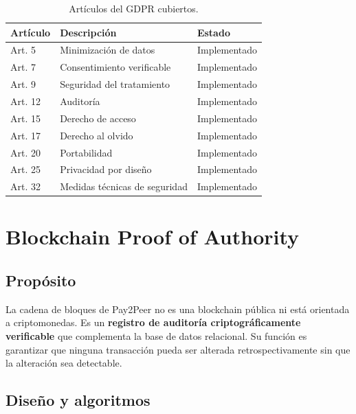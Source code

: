\begin{table}[H]
\centering
\caption{Artículos del GDPR cubiertos.}\label{tab:gdpr}
\begin{tabularx}{\textwidth}{lXl}
\toprule
\textbf{Artículo} & \textbf{Descripción} & \textbf{Estado} \\
\midrule
Art. 5  & Minimización de datos & Implementado \\
Art. 7  & Consentimiento verificable & Implementado \\
Art. 9  & Seguridad del tratamiento & Implementado \\
Art. 12 & Auditoría & Implementado \\
Art. 15 & Derecho de acceso & Implementado \\
Art. 17 & Derecho al olvido & Implementado \\
Art. 20 & Portabilidad & Implementado \\
Art. 25 & Privacidad por diseño & Implementado \\
Art. 32 & Medidas técnicas de seguridad & Implementado \\
\bottomrule
\end{tabularx}
\end{table}

\chapter{Blockchain Proof of Authority}\label{ch:blockchain}

\section{Propósito}

La cadena de bloques de Pay2Peer no es una blockchain pública ni está orientada a criptomonedas. Es un \textbf{registro de auditoría criptográficamente verificable} que complementa la base de datos relacional. Su función es garantizar que ninguna transacción pueda ser alterada retrospectivamente sin que la alteración sea detectable.

\section{Diseño y algoritmos}


